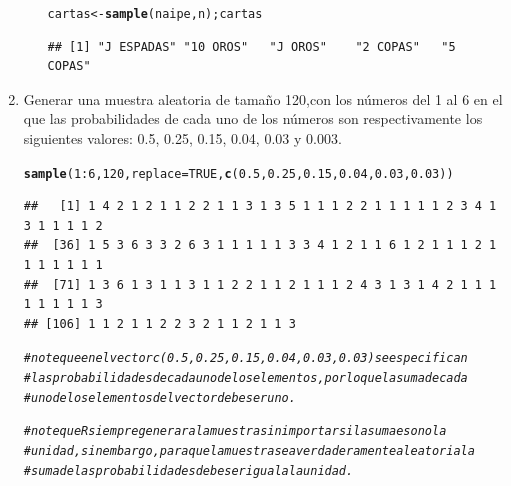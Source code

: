 \documentclass[12pt,letterpaper]{article}\usepackage[]{graphicx}\usepackage[]{color}
\makeatletter
\newcommand{\hlnum}[1]{\textcolor[rgb]{0.686,0.059,0.569}{#1}}%
\newcommand{\hlcom}[1]{\textcolor[rgb]{0.678,0.584,0.686}{\textit{#1}}}%
\newcommand{\hlopt}[1]{\textcolor[rgb]{0,0,0}{#1}}%
\newcommand{\hlstd}[1]{\textcolor[rgb]{0.345,0.345,0.345}{#1}}%
\newcommand{\hlkwb}[1]{\textcolor[rgb]{0.69,0.353,0.396}{#1}}%
\newcommand{\hlkwc}[1]{\textcolor[rgb]{0.333,0.667,0.333}{#1}}%
\newcommand{\hlkwd}[1]{\textcolor[rgb]{0.737,0.353,0.396}{\textbf{#1}}}%
\newenvironment{kframe}{%
 \def\at@end@of@kframe{}%
 \ifinner\ifhmode%
  \def\at@end@of@kframe{\end{minipage}}%
  \begin{minipage}{\columnwidth}%
 \fi\fi%
 \def\FrameCommand##1{\hskip\@totalleftmargin \hskip-\fboxsep
 \colorbox{shadecolor}{##1}\hskip-\fboxsep
     \hskip-\linewidth \hskip-\@totalleftmargin \hskip\columnwidth}%
 \MakeFramed {\advance\hsize-\width
   \@totalleftmargin\z@ \linewidth\hsize
   \@setminipage}}%
 {\par\unskip\endMakeFramed%
 \at@end@of@kframe}
\newenvironment{knitrout}{}{} %
\makeatother
\begin{document}
\begin{enumerate}
\begin{itemize}
\begin{knitrout}
\begin{kframe}
\begin{alltt}
\hlstd{cartas} \hlkwb{<-} \hlkwd{sample}\hlstd{(naipe, n) ; cartas}
\end{alltt}
\begin{verbatim}
## [1] "J ESPADAS" "10 OROS"   "J OROS"    "2 COPAS"   "5 COPAS"
\end{verbatim}
\end{kframe}
\end{knitrout}

\end{itemize}

\item Generar una muestra aleatoria de tama\~no 120,con los n\'umeros del 1 
al 6 en el que las probabilidades de cada uno de los n\'umeros son respectivamente los siguientes valores: 0.5, 0.25, 0.15, 0.04, 0.03 y 0.003.

\begin{knitrout}
\color{fgcolor}\begin{kframe}
\begin{alltt}
\hlkwd{sample}\hlstd{(}\hlnum{1}\hlopt{:}\hlnum{6}\hlstd{,}\hlnum{120}\hlstd{,}\hlkwc{replace}\hlstd{=}\hlnum{TRUE}\hlstd{,} \hlkwd{c}\hlstd{(}\hlnum{0.5}\hlstd{,}\hlnum{0.25}\hlstd{,}\hlnum{0.15}\hlstd{,}\hlnum{0.04}\hlstd{,}\hlnum{0.03}\hlstd{,}\hlnum{0.03}\hlstd{))}
\end{alltt}
\begin{verbatim}
##   [1] 1 4 2 1 2 1 1 2 2 1 1 3 1 3 5 1 1 1 2 2 1 1 1 1 1 2 3 4 1 3 1 1 1 1 2
##  [36] 1 5 3 6 3 3 2 6 3 1 1 1 1 1 3 3 4 1 2 1 1 6 1 2 1 1 1 2 1 1 1 1 1 1 1
##  [71] 1 3 6 1 3 1 1 3 1 1 2 2 1 1 2 1 1 1 2 4 3 1 3 1 4 2 1 1 1 1 1 1 1 1 3
## [106] 1 1 2 1 1 2 2 3 2 1 1 2 1 1 3
\end{verbatim}
\begin{alltt}
 \hlcom{# note que en el vector c(0.5,0.25,0.15,0.04,0.03,0.03) se especifican }
\hlcom{# las probabilidades de cada uno de los elementos, por lo que la suma de cada }
\hlcom{# uno de los elementos del vector debe ser uno. }
\end{alltt}
\end{kframe}
\end{knitrout}

\begin{knitrout}
\color{fgcolor}\begin{kframe}
\begin{alltt}
\hlcom{# note que R siempre generara la muestra sin importar si la suma es o no la }
\hlcom{# unidad, sin embargo, para que la muestra sea verdaderamente aleatoria la }
\hlcom{# suma de las probabilidades debe ser igual a la unidad.}
\end{alltt}
\end{kframe}
\end{knitrout}


\end{enumerate}
\end{document}
